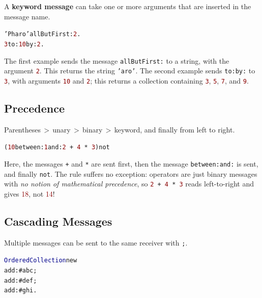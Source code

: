 \documentclass[notumble]{leaflet}
\makeatletter
\newenvironment{displaycode}{%
     \par
     \hspace{1.5em}\begin{minipage}{\linewidth}
       \begin{alltt}\small}{
       \end{alltt}
     \end{minipage}
     \par}
\newcommand{\code}[1]{\foreignlanguage{english}{\texttt{#1}}}
\makeatother
\begin{document}
A \textbf{keyword message} can take one or more
arguments that are inserted in the message name.

\begin{displaycode}
\textcolor{string}{'Pharo'} allButFirst: \textcolor{darkRed}{2}.
\textcolor{darkRed}{3} to: \textcolor{darkRed}{10} by: \textcolor{darkRed}{2}.
\end{displaycode}

The first example sends the message \code{allButFirst:} to a string,
with the argument \textcolor{darkRed}{\code{2}}. This returns the
string \textcolor{string}{\code{'aro'}}. The second example sends
\code{to:by:} to \textcolor{darkRed}{\code{3}}, with arguments
\textcolor{darkRed}{\code{10}} and \textcolor{darkRed}{\code{2}}; this
returns a collection containing \textcolor{darkRed}{\code{3}},
\textcolor{darkRed}{\code{5}}, \textcolor{darkRed}{\code{7}}, and
\textcolor{darkRed}{\code{9}}.

\subsection{Precedence}

Parentheses\,$>$\,unary\,$>$\,binary\,$>$\,keyword, and finally from
left to right.

\begin{displaycode}
(\textcolor{darkRed}{10} between: \textcolor{darkRed}{1} and: \textcolor{darkRed}{2}\,+\,\textcolor{darkRed}{4}\,*\,\textcolor{darkRed}{3}) not
\end{displaycode}

Here, the messages \code{+} and \code{*} are sent first, then the message \code{between:and:} is sent, and finally \code{not}.
The rule suffers no exception: operators are just binary messages with \emph{no notion of mathematical precedence}, so
\code{\textcolor{darkRed}{2}\,+\,\textcolor{darkRed}{4}\,*\,\textcolor{darkRed}{3}} reads left-to-right and gives \textcolor{darkRed}{18}, not \textcolor{darkRed}{14}!


\subsection{Cascading Messages}

Multiple messages can be sent to the same receiver with \code{;}.

\begin{displaycode}
\textcolor{darkBlue}{OrderedCollection} new
  add: \textcolor{string}{#abc};
  add: \textcolor{string}{#def};
  add: \textcolor{string}{#ghi}.
\end{displaycode}
\end{document}
